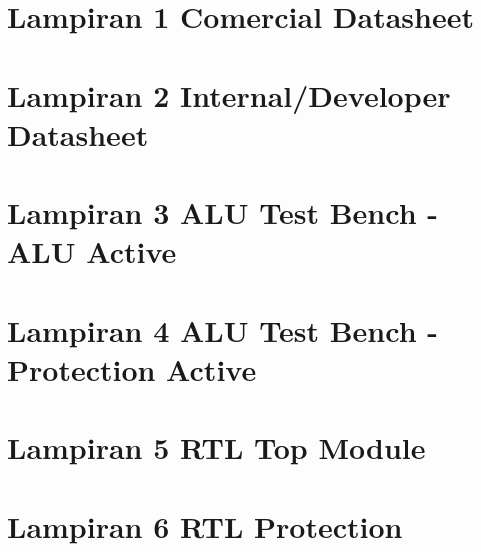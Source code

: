 
\chapter*{Lampiran 1 Comercial Datasheet}

\chapter*{Lampiran 2 Internal/Developer Datasheet}


\chapter*{Lampiran 3 ALU Test Bench - ALU Active}


\chapter*{Lampiran 4 ALU Test Bench - Protection Active}



\chapter*{Lampiran 5 RTL Top Module}


\chapter*{Lampiran 6 RTL Protection}

